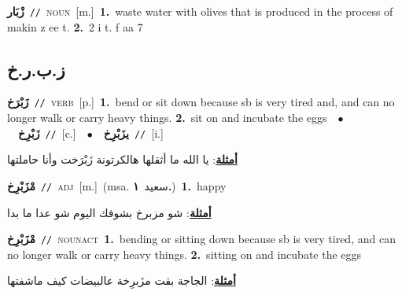 \documentclass[10pt,a4paper,twoside]{article} %
\begin{document}
\begin{multicols}{2}
{\setlength\topsep{0pt}\textbf{\foreignlanguage{arabic}{زْبَار}}\ {\color{gray}\texttt{//}\color{black}}\ \textsc{noun}\ [m.]\ \textbf{1.}~waste water with olives that is produced in the process of makin z ee t.  \textbf{2.}~2 i t. f aa 7\ } \vspace{2mm}

\vspace{-3mm}
\subsection*{\color{blue}\foreignlanguage{arabic}{ز.ب.ر.خ}\color{blue}{}} 

{\setlength\topsep{0pt}\textbf{\foreignlanguage{arabic}{زَبْرَخ}}\ {\color{gray}\texttt{//}\color{black}}\ \textsc{verb}\ [p.]\ \textbf{1.}~bend or sit down because sb is very tired and, and can no longer walk or carry heavy things.  \textbf{2.}~sit on and incubate the eggs\ \ $\bullet$\ \ \setlength\topsep{0pt}\textbf{\foreignlanguage{arabic}{زَبْرِخ}}\ {\color{gray}\texttt{//}\color{black}}\ [c.]\ \ $\bullet$\ \ \setlength\topsep{0pt}\textbf{\foreignlanguage{arabic}{يزَبْرِخ}}\ {\color{gray}\texttt{//}\color{black}}\ [i.]\  \begin{flushright}\color{gray}\foreignlanguage{arabic}{\textbf{\underline{\foreignlanguage{arabic}{أمثلة}}}: يا الله ما أثقلها هالكرتونة زَبْرَخت وأنا حاملتها}\end{flushright}\color{black}} \vspace{2mm}

{\setlength\topsep{0pt}\textbf{\foreignlanguage{arabic}{مْزَبْرِخ}}\ {\color{gray}\texttt{//}\color{black}}\ \textsc{adj}\ [m.]\ \color{gray}(msa. \foreignlanguage{arabic}{سعيد}~\foreignlanguage{arabic}{\textbf{١.}})\color{black}\ \textbf{1.}~happy\  \begin{flushright}\color{gray}\foreignlanguage{arabic}{\textbf{\underline{\foreignlanguage{arabic}{أمثلة}}}: شو مزبرخ بشوفك اليوم شو عدا ما بدا}\end{flushright}\color{black}} \vspace{2mm}

{\setlength\topsep{0pt}\textbf{\foreignlanguage{arabic}{مْزَبْرِخ}}\ {\color{gray}\texttt{//}\color{black}}\ \textsc{noun\textunderscore act}\ \textbf{1.}~bending or sitting down because sb is very tired, and can no longer walk or carry heavy things.  \textbf{2.}~sitting on and incubate the eggs\  \begin{flushright}\color{gray}\foreignlanguage{arabic}{\textbf{\underline{\foreignlanguage{arabic}{أمثلة}}}: الجاجة بقت مزَبرِخة عالبيضات كيف ماشفتها}\end{flushright}\color{black}} \vspace{2mm}


\end{multicols}
\end{document}
